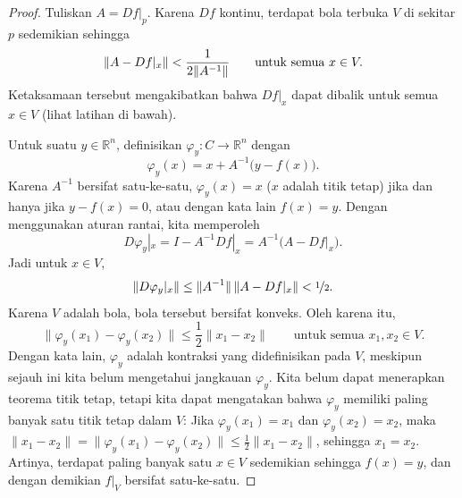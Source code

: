 \documentclass[12pt,openany]{book}
\newcommand{\avoidbreak}{\postdisplaypenalty=100}
\newcommand{\snorm}[1]{\lVert {#1} \rVert}
\newcommand{\R}{{\mathbb{R}}}
\theoremstyle{plain}
\theoremstyle{remark}
\theoremstyle{definition}
\theoremstyle{exercise}
\theoremstyle{example}
\begin{document}
\begin{proof}
Tuliskan $A = Df|_p$.  Karena $Df$ kontinu, terdapat bola terbuka
$V$ di sekitar $p$ sedemikian sehingga
\begin{equation*}
\snorm{A-Df|_x} < \frac{1}{2\snorm{A^{-1}}}
\qquad \text{untuk semua } x \in V.
\avoidbreak
\end{equation*}
Ketaksamaan tersebut mengakibatkan bahwa $Df|_x$ dapat dibalik untuk semua $x \in V$
(lihat latihan di bawah).

Untuk suatu $y \in \R^n$, definisikan $\varphi_y \colon C \to \R^n$ dengan
\begin{equation*}
\varphi_y (x) = x + A^{-1}\bigl(y-f(x)\bigr) .
\end{equation*}
Karena $A^{-1}$ bersifat satu-ke-satu,
$\varphi_y(x) = x$ ($x$ adalah titik tetap) jika dan hanya jika
$y-f(x) = 0$, atau dengan kata lain $f(x)=y$.  Dengan menggunakan aturan rantai, kita memperoleh
\begin{equation*}
D\varphi_y|_x = I - A^{-1} Df|_x = A^{-1} \bigl( A-Df|_x \bigr) .
\end{equation*}
Jadi untuk $x \in V$,
\begin{equation*}
\snorm{D\varphi_y|_x} \leq \snorm{A^{-1}} \, \snorm{A-Df|_x} < \nicefrac{1}{2} .
\end{equation*}
Karena $V$ adalah bola, bola tersebut bersifat konveks.  Oleh karena itu,
\begin{equation*}
\snorm{\varphi_y(x_1)-\varphi_y(x_2)} \leq \frac{1}{2} \snorm{x_1-x_2} 
\qquad
\text{untuk semua } x_1,x_2 \in V.
\end{equation*}
Dengan kata lain, $\varphi_y$ adalah kontraksi yang didefinisikan pada $V$, meskipun sejauh ini kita
belum mengetahui jangkauan $\varphi_y$.  Kita belum dapat
menerapkan teorema
titik tetap, tetapi kita dapat mengatakan bahwa $\varphi_y$
memiliki paling banyak satu titik tetap dalam $V$:
Jika $\varphi_y(x_1) = x_1$ dan
$\varphi_y(x_2) = x_2$, maka
$\snorm{x_1-x_2} = \snorm{\varphi_y(x_1)-\varphi_y(x_2)} \leq
\frac{1}{2} \snorm{x_1-x_2}$, sehingga $x_1 = x_2$.
Artinya, terdapat paling banyak satu $x \in V$
sedemikian sehingga $f(x) = y$, dan dengan demikian $f|_V$ bersifat satu-ke-satu.


\end{proof}
\end{document}
